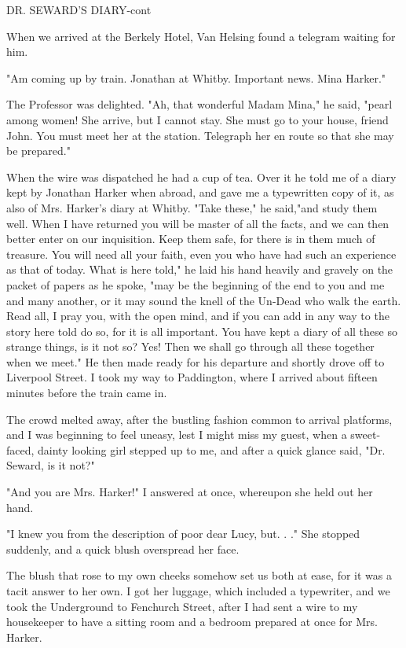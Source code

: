 DR. SEWARD'S DIARY-cont 

When we arrived at the Berkely Hotel, Van Helsing found a telegram waiting for him. 

"Am coming up by train. Jonathan at Whitby. Important news. Mina Harker." 

The Professor was delighted. "Ah, that wonderful Madam Mina," he said, "pearl among women! She arrive, but I cannot stay. She must go to your house, friend John. You must meet her at the station. Telegraph her en route so that she may be prepared." 

When the wire was dispatched he had a cup of tea. Over it he told me of a diary kept by Jonathan Harker when abroad, and gave me a typewritten copy of it, as also of Mrs. Harker's diary at Whitby. "Take these," he said,"and study them well. When I have returned you will be master of all the facts, and we can then better enter on our inquisition. Keep them safe, for there is in them much of treasure. You will need all your faith, even you who have had such an experience as that of today. What is here told," he laid his hand heavily and gravely on the packet of papers as he spoke, "may be the beginning of the end to you and me and many another, or it may sound the knell of the Un-Dead who walk the earth. Read all, I pray you, with the open mind, and if you can add in any way to the story here told do so, for it is all important. You have kept a diary of all these so strange things, is it not so? Yes! Then we shall go through all these together when we meet." He then made ready for his departure and shortly drove off to Liverpool Street. I took my way to Paddington, where I arrived about fifteen minutes before the train came in. 

The crowd melted away, after the bustling fashion common to arrival platforms, and I was beginning to feel uneasy, lest I might miss my guest, when a sweet-faced, dainty looking girl stepped up to me, and after a quick glance said, "Dr. Seward, is it not?" 

"And you are Mrs. Harker!" I answered at once, whereupon she held out her hand. 

"I knew you from the description of poor dear Lucy, but. . ." She stopped suddenly, and a quick blush overspread her face. 

The blush that rose to my own cheeks somehow set us both at ease, for it was a tacit answer to her own. I got her luggage, which included a typewriter, and we took the Underground to Fenchurch Street, after I had sent a wire to my housekeeper to have a sitting room and a bedroom prepared at once for Mrs. Harker. 

